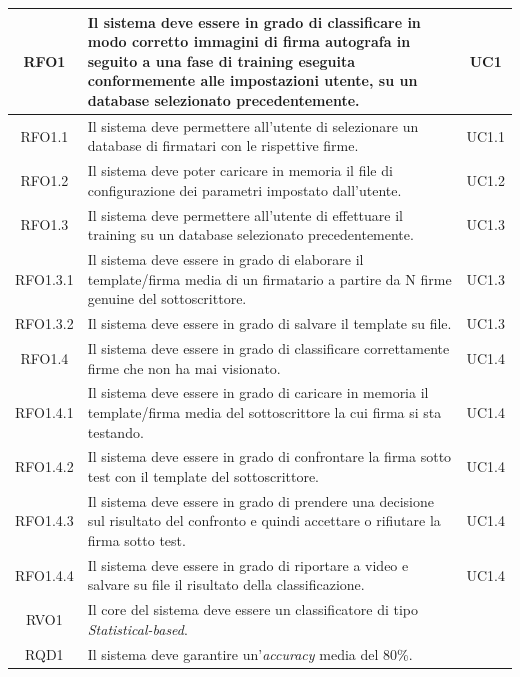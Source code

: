 \begin{longtable}{|c|p{9cm}|c|}
\midrule
RFO1
& Il sistema deve essere in grado di classificare in modo corretto immagini di firma autografa in seguito a una fase di training eseguita conformemente alle impostazioni utente, su un database selezionato precedentemente.
& UC1
\\
\midrule
RFO1.1
& Il sistema deve permettere all'utente di selezionare un database di firmatari con le rispettive firme.
& UC1.1
\\
\midrule
RFO1.2
& Il sistema deve poter caricare in memoria il file di configurazione dei parametri impostato dall'utente.
& UC1.2
\\
\midrule
RFO1.3
&  Il sistema deve permettere all'utente di effettuare il training su un database selezionato precedentemente.
& UC1.3
\\
\midrule
RFO1.3.1
& Il sistema deve essere in grado di elaborare il template/firma media di un firmatario a partire da N firme genuine del sottoscrittore.
& UC1.3
\\
\midrule
RFO1.3.2
& Il sistema deve essere in grado di salvare il template su file.
& UC1.3
\\
\midrule
RFO1.4
& Il sistema deve essere in grado di classificare correttamente firme che non ha mai visionato.
& UC1.4
\\
\midrule
RFO1.4.1
& Il sistema deve essere in grado di caricare in memoria il template/firma media del sottoscrittore la cui firma si sta testando.
& UC1.4
\\
\midrule
RFO1.4.2
& Il sistema deve essere in grado di confrontare la firma sotto test con il template del sottoscrittore.
& UC1.4
\\
\midrule
RFO1.4.3
& Il sistema deve essere in grado di prendere una decisione sul risultato del confronto e quindi accettare o rifiutare la firma sotto test.
& UC1.4
\\
\midrule
RFO1.4.4
& Il sistema deve essere in grado di riportare a video e salvare su file il risultato della classificazione.
& UC1.4
\\
\midrule
RVO1
& Il core del sistema deve essere un classificatore di tipo \emph{Statistical-based}.
&
\\
\midrule
RQD1
& Il sistema deve garantire un'\emph{accuracy} media del 80\%.
& 
\end{longtable}
